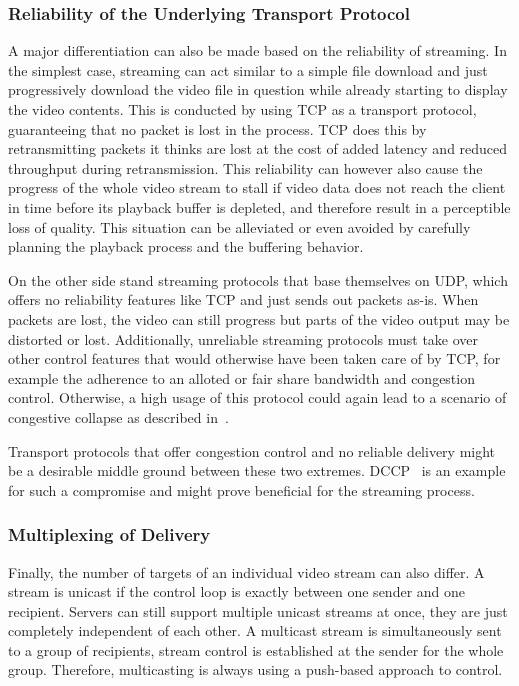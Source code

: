 \subsubsection{Reliability of the Underlying Transport Protocol}
A major differentiation can also be made based on the reliability of streaming. In the simplest case, streaming can act similar to a simple file download and just progressively download the video file in question while already starting to display the video contents. This is conducted by using \gls{TCP} as a transport protocol, guaranteeing that no packet is lost in the process. \gls{TCP} does this by retransmitting packets it thinks are lost at the cost of added latency and reduced throughput during retransmission. This reliability can however also cause the progress of the whole video stream to stall if video data does not reach the client in time before its playback buffer is depleted, and therefore result in a perceptible loss of quality. This situation can be alleviated or even avoided by carefully planning the playback process and the buffering behavior.

On the other side stand streaming protocols that base themselves on \gls{UDP}, which offers no reliability features like \gls{TCP} and just sends out packets as-is. When packets are lost, the video can still progress but parts of the video output may be distorted or lost. Additionally, unreliable streaming protocols must take over other control features that would otherwise have been taken care of by \gls{TCP}, for example the adherence to an alloted or fair share bandwidth and congestion control. Otherwise, a high usage of this protocol could again lead to a scenario of congestive collapse as described in~\cite{rfc896}.

Transport protocols that offer congestion control and no reliable delivery might be a desirable middle ground between these two extremes. \gls{DCCP}~\cite{kohler2006designing} is an example for such a compromise and might prove beneficial for the streaming process.


\subsubsection{Multiplexing of Delivery}
Finally, the number of targets of an individual video stream can also differ. A stream is unicast if the control loop is exactly between one sender and one recipient. Servers can still support multiple unicast streams at once, they are just completely independent of each other. A multicast stream is simultaneously sent to a group of recipients, stream control is established at the sender for the whole group. Therefore, multicasting is always using a push-based approach to control.


